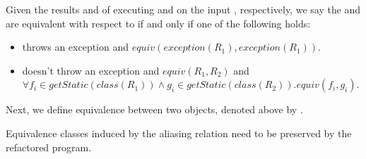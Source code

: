 \documentclass[runningheads,a4paper]{llncs}
\begin{document}
\begin{definition}
  Given the results  and  of executing  and 
  on the input , respectively, we say the  and  are equivalent
  with respect to  if and only if one of the following holds:

  \begin{itemize}
  \item {} throws an exception and   $equiv(exception(R_1), exception(R_1))$. 
  \item {} doesn't throw an exception and $equiv(R_1,R_2)$ and
    $\forall f_i \in getStatic(class(R_1)) \wedge g_i \in getStatic(class(R_2)). equiv(f_i,g_i)$.
    \end{itemize}
    
  \end{definition}

  
Next, we define equivalence between two objects, denoted above by .

Equivalence classes induced by the aliasing relation need to be preserved by the
refactored program.









\end{document}
